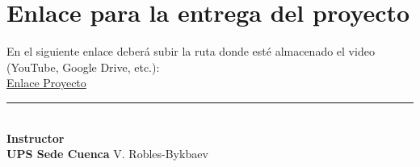 \documentclass[a4paper,10pt]{article}
\begin{document}
\section{Enlace para la entrega del proyecto}

En el siguiente enlace deberá subir la ruta donde esté almacenado el video (YouTube, Google Drive, etc.):\\
\hspace*{0.43cm} \href{https://forms.gle/m53jxtTg1fGqboHD9}{Enlace Proyecto}\\




\vspace{2.8cm}

\begin{center}

\begin{minipage}{0.2\textwidth}
\begin{flushleft}
\rule{3.3cm}{0.4pt} \\[0.5cm]
\textbf{Instructor}\\
\textbf{UPS Sede Cuenca}
V. Robles-Bykbaev
\end{flushleft}
\end{minipage}

\end{center}




\end{document}
